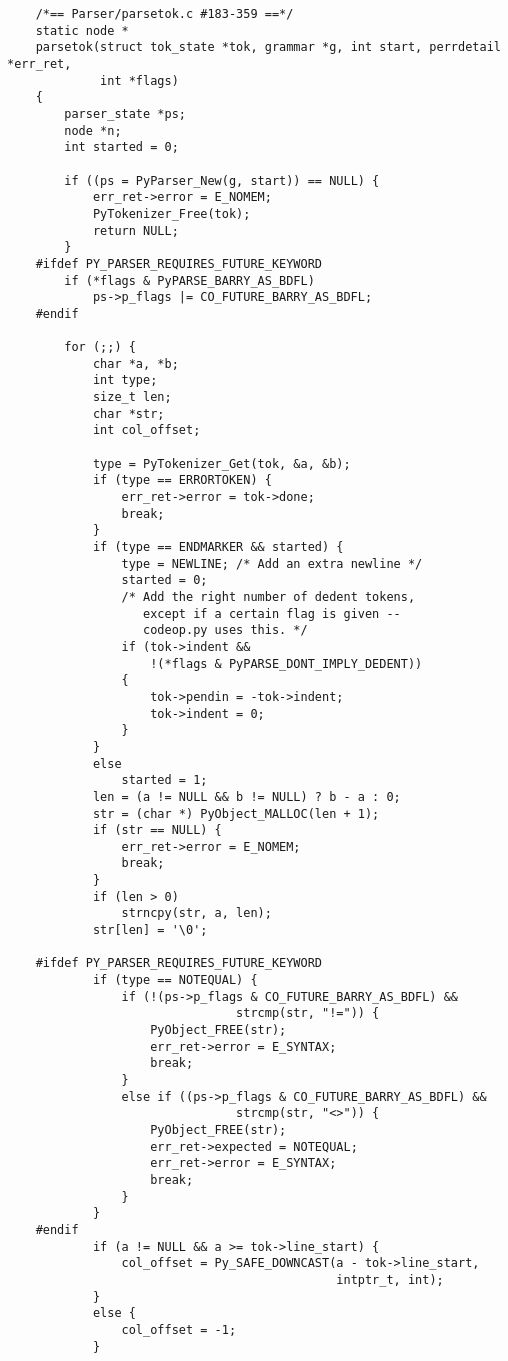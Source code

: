 \documentclass[UTF8]{book}
\begin{document}
\begin{lstlisting}
    /*== Parser/parsetok.c #183-359 ==*/
    static node *
    parsetok(struct tok_state *tok, grammar *g, int start, perrdetail *err_ret,
             int *flags)
    {
        parser_state *ps;
        node *n;
        int started = 0;
    
        if ((ps = PyParser_New(g, start)) == NULL) {
            err_ret->error = E_NOMEM;
            PyTokenizer_Free(tok);
            return NULL;
        }
    #ifdef PY_PARSER_REQUIRES_FUTURE_KEYWORD
        if (*flags & PyPARSE_BARRY_AS_BDFL)
            ps->p_flags |= CO_FUTURE_BARRY_AS_BDFL;
    #endif
    
        for (;;) {
            char *a, *b;
            int type;
            size_t len;
            char *str;
            int col_offset;
    
            type = PyTokenizer_Get(tok, &a, &b);
            if (type == ERRORTOKEN) {
                err_ret->error = tok->done;
                break;
            }
            if (type == ENDMARKER && started) {
                type = NEWLINE; /* Add an extra newline */
                started = 0;
                /* Add the right number of dedent tokens,
                   except if a certain flag is given --
                   codeop.py uses this. */
                if (tok->indent &&
                    !(*flags & PyPARSE_DONT_IMPLY_DEDENT))
                {
                    tok->pendin = -tok->indent;
                    tok->indent = 0;
                }
            }
            else
                started = 1;
            len = (a != NULL && b != NULL) ? b - a : 0;
            str = (char *) PyObject_MALLOC(len + 1);
            if (str == NULL) {
                err_ret->error = E_NOMEM;
                break;
            }
            if (len > 0)
                strncpy(str, a, len);
            str[len] = '\0';
    
    #ifdef PY_PARSER_REQUIRES_FUTURE_KEYWORD
            if (type == NOTEQUAL) {
                if (!(ps->p_flags & CO_FUTURE_BARRY_AS_BDFL) &&
                                strcmp(str, "!=")) {
                    PyObject_FREE(str);
                    err_ret->error = E_SYNTAX;
                    break;
                }
                else if ((ps->p_flags & CO_FUTURE_BARRY_AS_BDFL) &&
                                strcmp(str, "<>")) {
                    PyObject_FREE(str);
                    err_ret->expected = NOTEQUAL;
                    err_ret->error = E_SYNTAX;
                    break;
                }
            }
    #endif
            if (a != NULL && a >= tok->line_start) {
                col_offset = Py_SAFE_DOWNCAST(a - tok->line_start,
                                              intptr_t, int);
            }
            else {
                col_offset = -1;
            }
    

\end{lstlisting}
\end{document}
